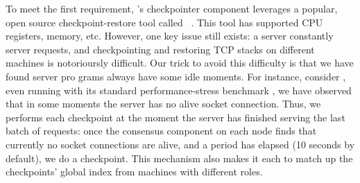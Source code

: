 
To meet the first requirement, \xxx's checkpointer component leverages a 
popular, open source checkpoint-restore tool called \criu~\cite{criu}. This 
tool has supported CPU registers, memory, etc. However, one key issue still 
exists: a server constantly server requests, and checkpointing and restoring 
TCP stacks on different machines is notorioursly difficult. Our trick to avoid 
this difficulty is that we have found server pro grams always have some idle 
moments. For instance, consider \apache, even running with its standard 
performance-stress benchmark \ab, we have observed that in some moments the 
server has no alive socket connection. Thus, we performs each checkpoint at the 
moment the server has finished serving the last batch of requests: once the 
\paxos consensus component on each node finds that currently no socket 
connections are alive, and a period has elapsed (10 seconds by default), we do 
a checkpoint. This mechanism also makes it each to match up the checkpoints' 
global index from machines with different roles.

